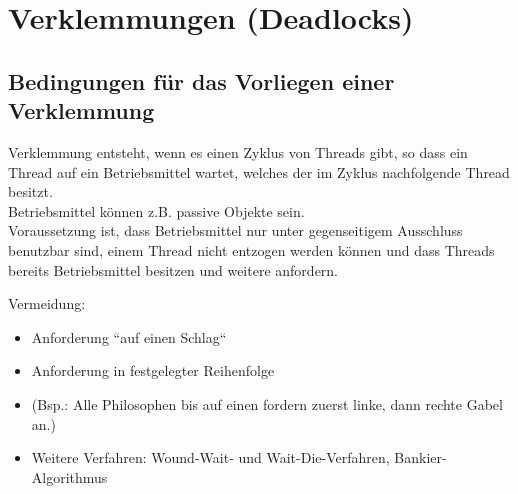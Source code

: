 \section{Verklemmungen (Deadlocks)}

 \subsection{Bedingungen für das Vorliegen einer Verklemmung}
Verklemmung entsteht, wenn es einen Zyklus von Threads gibt, so dass ein Thread auf ein Betriebsmittel wartet, welches der im Zyklus nachfolgende Thread besitzt.\\
Betriebsmittel können z.B. passive Objekte sein.\\
Voraussetzung ist, dass Betriebsmittel nur unter gegenseitigem Ausschluss benutzbar sind, einem Thread nicht entzogen werden können und dass Threads bereits Betriebsmittel besitzen und weitere anfordern.


Vermeidung:
\begin{itemize}
    \item Anforderung ``auf einen Schlag``
    \item Anforderung in festgelegter Reihenfolge
    \item[] (Bsp.: Alle Philosophen bis auf einen fordern zuerst linke, dann rechte Gabel an.)
    \item Weitere Verfahren: Wound-Wait- und Wait-Die-Verfahren, Bankier-Algorithmus
\end{itemize}
